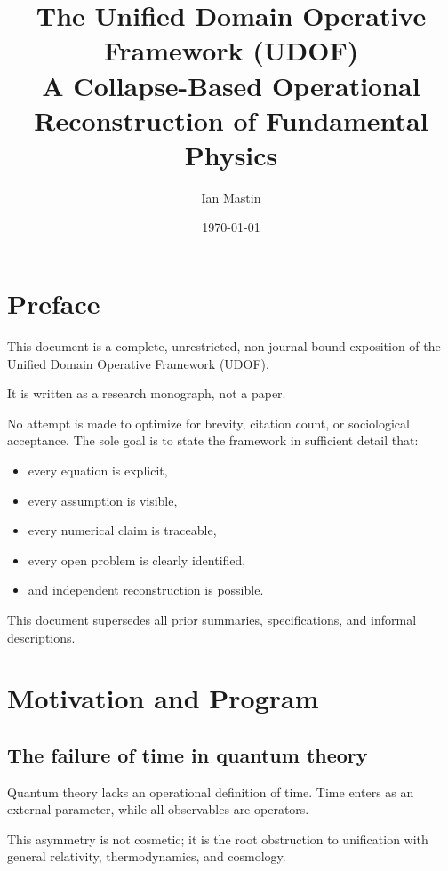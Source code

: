 \documentclass[11pt]{book}
\title{\textbf{The Unified Domain Operative Framework (UDOF)}\\
\large A Collapse-Based Operational Reconstruction of Fundamental Physics}
\author{Ian Mastin}
\date{\today}
\begin{document}
\frontmatter
\maketitle
\tableofcontents
\newpage

\chapter*{Preface}

This document is a complete, unrestricted, non-journal-bound exposition of the
Unified Domain Operative Framework (UDOF).

It is written as a research monograph, not a paper.

No attempt is made to optimize for brevity, citation count, or sociological
acceptance. The sole goal is to state the framework in sufficient detail that:

\begin{itemize}
\item every equation is explicit,
\item every assumption is visible,
\item every numerical claim is traceable,
\item every open problem is clearly identified,
\item and independent reconstruction is possible.
\end{itemize}

This document supersedes all prior summaries, specifications, and informal
descriptions.

\mainmatter

\chapter{Motivation and Program}

\section{The failure of time in quantum theory}

Quantum theory lacks an operational definition of time. Time enters as an
external parameter, while all observables are operators.

This asymmetry is not cosmetic; it is the root obstruction to unification with
general relativity, thermodynamics, and cosmology.
\end{document}
